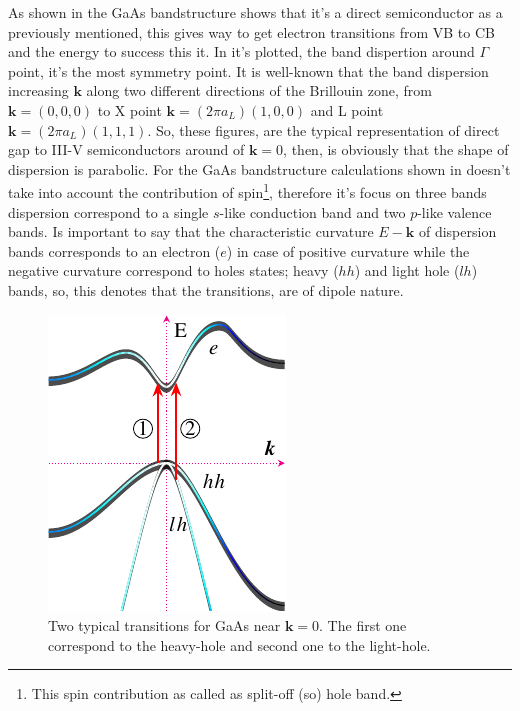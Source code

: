 As shown in  the GaAs bandstructure shows that it's a direct semiconductor as a previously mentioned, this gives way to get electron transitions from VB to CB and the energy to success this it. In  it's plotted, the band dispertion around $\Gamma$ point, it's the most symmetry point.  It is well-known that the band dispersion increasing $\boldsymbol{k}$ along two different directions of the Brillouin zone, from $\boldsymbol{k}=(0,0,0)$ to X point $\boldsymbol{k}=(2\pi a_{L})(1,0,0)$ and L point $\boldsymbol{k}=(2\pi a_{L})(1,1,1)$.  So, these figures, are the typical representation of direct gap to III-V semiconductors around of  $\boldsymbol{k}=0$, then, is obviously that the shape of dispersion is parabolic. For the GaAs bandstructure calculations shown in  doesn't take into account the contribution of spin\footnote{This spin contribution as called as split-off (so) hole band.}, therefore it's focus on three bands dispersion correspond to a single $s$-like conduction band and two $p$-like valence bands.  Is important to say that the characteristic curvature $E\!\!-\!\!\boldsymbol{k}$ of dispersion bands corresponds to an electron ($e$) in case of positive curvature while the negative curvature correspond to holes states; heavy ($hh$) and light hole ($lh$) bands, so, this denotes that the transitions, are of dipole nature\cite{fox2002optical,cardona2005fundamentals}. 
\begin{figure}[h!]
	\centering
		\includegraphics[width=0.5\linewidth]{../figures/chapter-1/bands/build/bands02}
	\caption{Two typical transitions for GaAs near $\boldsymbol{k}=0$. The first one correspond to the heavy-hole and second one to the light-hole. }
	\label{fig:subsubsection-1.1.1-GaAsbands-2}
\end{figure}
